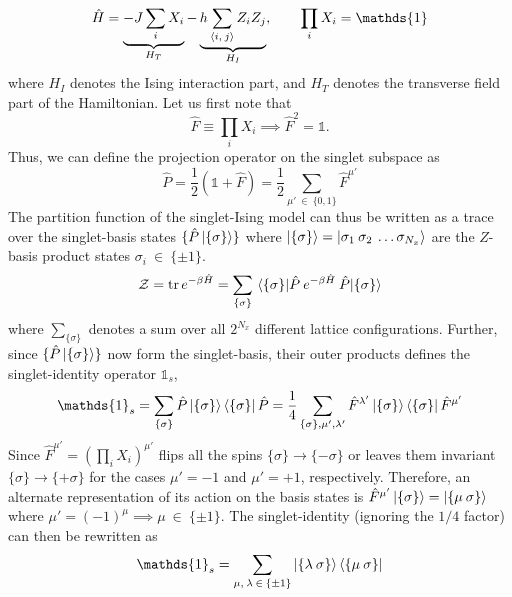 \documentclass[../thesis_main.tex]{subfiles}
\begin{document}
\begin{equation}
    \hat{H} = \underbrace{-J \sum_i X_i}_{H_T} - \underbrace{h \sum_{\expval{i, \:j}} Z_{i} Z_{j}}_{H_I}, \qquad \prod_i X_i = \mathds{1}
\end{equation} 
where $H_I$ denotes the Ising interaction part, and $H_T$ denotes the transverse field part of the Hamiltonian. Let us first note that
\begin{equation}
    \hat{F} \equiv \prod_i X_i \implies \hat{F}^2 = \mathds{1}.
    \label{flipoperator}
\end{equation}  
Thus, we can define the projection operator on the singlet subspace as
\begin{equation}
    \hat{P} = \frac{1}{2}(\mathds{1} + \hat{F}) = \frac{1}{2} \sum_{\mu' \: \in \: \{0, 1\}} \hat{F}^{\mu'}
\end{equation}
The partition function of the singlet-Ising model can thus be written as a trace over the singlet-basis states $\{\hat{P} \ket{\{\sigma\}} \}$ where $\ket{\{\sigma\}} = \ket{\sigma_1 \: \sigma_2 \: \ldots \sigma_{N_x}}$ are the $Z$-basis product states $\sigma_i \: \in \: \{\pm 1\}$.
\begin{equation}
    \mathcal{Z} = \tr e^{-\beta \hat{H}} = \sum_{\{\sigma\}} \mel{\{\sigma\}}{\hat{P} \: e^{-\beta \hat{H}} \: \hat{P}}{\{\sigma\}}
\end{equation}
where $\sum_{\{\sigma\}}$ denotes a sum over all $2^{N_x}$ different lattice configurations. Further, since $\{\hat{P} \ket{\{\sigma\}} \}$ now form the singlet-basis, their outer products defines the singlet-identity operator $\mathds{1}_s$,
\begin{equation}
    \mathds{1}_s = \sum_{\{\sigma\}} \hat{P} \ket{\{\sigma\}} \bra{\{\sigma\}} \hat{P} = \frac{1}{4} \sum_{\{\sigma\}, \mu', \lambda'} \hat{F}^{\lambda'} \ket{\{\sigma\}} \bra{\{\sigma\}} \hat{F}^{\mu'}  
\end{equation}
Since $\hat{F}^{\mu'} = (\prod_i X_i)^{\mu'}$ flips all the spins $\{\sigma\} \longrightarrow \{-\sigma\}$ or leaves them invariant $\{\sigma\} \longrightarrow \{+\sigma\}$ for the cases ${\mu'} = -1$ and ${\mu'} = +1$, respectively. Therefore, an alternate representation of its action on the basis states is $\hat{F}^{\mu'} \ket{\{\sigma\}} = \ket{\{\mu \: \sigma\}}$ where $\mu'= (-1)^{\mu} \implies \mu \: \in \: \{\pm 1\}$. The singlet-identity (ignoring the $1/4$ factor) can then be rewritten as
\begin{equation}
    \mathds{1}_s = \sum_{\mu, \:\lambda \: \in \: \{\pm 1\}} \ket{\{\lambda \: \sigma\}} \bra{\{\mu \: \sigma\}}
\end{equation}
\end{document}
